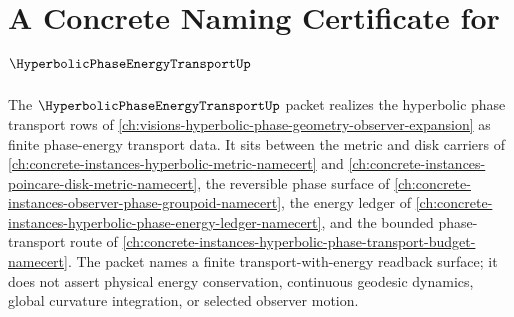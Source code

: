 \chapter{A Concrete Naming Certificate for $\HyperbolicPhaseEnergyTransportUp$}
\label{ch:concrete-instances-hyperbolic-phase-energy-transport-namecert}

The $\HyperbolicPhaseEnergyTransportUp$ packet realizes the hyperbolic phase transport rows of \autoref{ch:visions-hyperbolic-phase-geometry-observer-expansion} as finite phase-energy transport data. It sits between the metric and disk carriers of \autoref{ch:concrete-instances-hyperbolic-metric-namecert} and \autoref{ch:concrete-instances-poincare-disk-metric-namecert}, the reversible phase surface of \autoref{ch:concrete-instances-observer-phase-groupoid-namecert}, the energy ledger of \autoref{ch:concrete-instances-hyperbolic-phase-energy-ledger-namecert}, and the bounded phase-transport route of \autoref{ch:concrete-instances-hyperbolic-phase-transport-budget-namecert}. The packet names a finite transport-with-energy readback surface; it does not assert physical energy conservation, continuous geodesic dynamics, global curvature integration, or selected observer motion.

